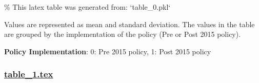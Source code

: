 \documentclass[11pt]{article}
\begin{document}
\begin{codeoutput}
\% This latex table was generated from: `table\_0.pkl`
\begin{table}[h]
\caption{Descriptive statistics of important numerical variables across the Pre and Post policy implementation groups}
\label{table:descriptives}
\begin{threeparttable}
\renewcommand{\TPTminimum}{\linewidth}
\begin{tablenotes}
\footnotesize
\item Values are represented as mean and standard deviation. The values in the table are grouped by the implementation of the policy (Pre or Post 2015 policy).
\item \textbf{Policy Implementation}: 0: Pre 2015 policy, 1: Post 2015 policy
\end{tablenotes}
\end{threeparttable}
\end{table}
\end{codeoutput}

\subsubsection*{\hyperlink{code-LaTeX Table Design-table-1-tex}{table\_1.tex}}
\end{document}
